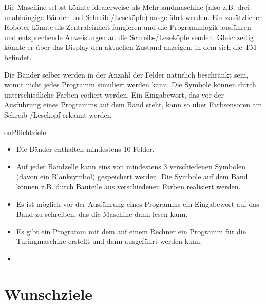 \documentclass[a4paper,12pt]{article}
\begin{document}
Die Maschine selbst könnte idealerweise als Mehrbandmaschine (also z.B. drei unabhängige Bänder und Schreib-/Leseköpfe) ausgeführt werden. Ein zusätzlicher Roboter könnte als Zentraleinheit fungieren und die Programmlogik ausführen und entsprechende Anweisungen an die Schreib-/Leseköpfe senden. Gleichzeitig könnte er über das Display den aktuellen Zustand anzeigen, in dem sich die TM befindet.

Die Bänder selber werden in der Anzahl der Felder natürlich beschränkt sein, womit nicht jedes Programm simuliert werden kann. Die Symbole können durch unterschiedliche Farben codiert werden. Ein Eingabewort, das vor der Ausführung eines Programms auf dem Band steht, kann so über Farbsensoren am Schreib-/Lesekopf erkannt werden.


\secti on{Pflichtziele}

\begin{itemize}
\ item Es wird mit LEGO-Robotern eine mechanische Simulation einer Turingmaschine mit mindestens einem Band und einem Schreib-/Lesekopf gebaut.
\item Die Bänder enthalten mindestens 10 Felder.
\item Auf jeder Bandzelle kann eins von mindestens 3 verschiedenen Symbolen (davon ein Blanksymbol) gespeichert werden. Die Symbole auf dem Band können z.B. durch Bauteile aus verschiedenen Farben realisiert werden.
\item Es ist möglich vor der Ausführung eines Programms ein Eingabewort auf das Band zu schreiben, das die Maschine dann lesen kann. 
\item Es gibt ein Programm mit dem auf einem Rechner ein Programm für die Turingmaschine erstellt und dann ausgeführt werden kann.
\item {}
\end{itemize}

\section{Wunschziele}
\end{document}
